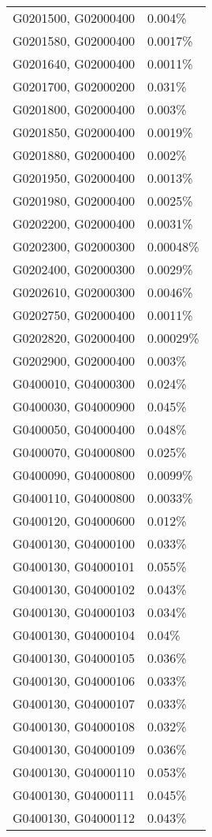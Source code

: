 \begin{longtable}[]{@{}ll@{}}
G0201500, G02000400 & 0.004\% \\
G0201580, G02000400 & 0.0017\% \\
G0201640, G02000400 & 0.0011\% \\
G0201700, G02000200 & 0.031\% \\
G0201800, G02000400 & 0.003\% \\
G0201850, G02000400 & 0.0019\% \\
G0201880, G02000400 & 0.002\% \\
G0201950, G02000400 & 0.0013\% \\
G0201980, G02000400 & 0.0025\% \\
G0202200, G02000400 & 0.0031\% \\
G0202300, G02000300 & 0.00048\% \\
G0202400, G02000300 & 0.0029\% \\
G0202610, G02000300 & 0.0046\% \\
G0202750, G02000400 & 0.0011\% \\
G0202820, G02000400 & 0.00029\% \\
G0202900, G02000400 & 0.003\% \\
G0400010, G04000300 & 0.024\% \\
G0400030, G04000900 & 0.045\% \\
G0400050, G04000400 & 0.048\% \\
G0400070, G04000800 & 0.025\% \\
G0400090, G04000800 & 0.0099\% \\
G0400110, G04000800 & 0.0033\% \\
G0400120, G04000600 & 0.012\% \\
G0400130, G04000100 & 0.033\% \\
G0400130, G04000101 & 0.055\% \\
G0400130, G04000102 & 0.043\% \\
G0400130, G04000103 & 0.034\% \\
G0400130, G04000104 & 0.04\% \\
G0400130, G04000105 & 0.036\% \\
G0400130, G04000106 & 0.033\% \\
G0400130, G04000107 & 0.033\% \\
G0400130, G04000108 & 0.032\% \\
G0400130, G04000109 & 0.036\% \\
G0400130, G04000110 & 0.053\% \\
G0400130, G04000111 & 0.045\% \\
G0400130, G04000112 & 0.043\% \\

\end{longtable}
